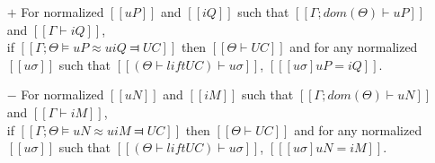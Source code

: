 \begin{lemma} \label{lemma:unification-soundness}
    \hfill
    \begin{itemize}
        \item [$+$] For normalized $[[uP]]$ and $[[iQ]]$ such that 
        $[[Γ ; dom(Θ) ⊢ uP]]$ and $[[Γ ⊢ iQ]]$,\\ 
        if $[[Γ ; Θ ⊨ uP ≈u iQ ⫤ UC]]$ then 
        $[[Θ ⊢ UC]]$ and for any normalized $[[uσ]]$ such that $[[(Θ  ⊢  lift UC) ⊢ uσ]]$,
        $[[ [uσ]uP = iQ ]]$.

        \item [$-$] For normalized $[[uN]]$ and $[[iM]]$ such that
        $[[Γ ; dom(Θ) ⊢ uN]]$ and $[[Γ ⊢ iM]]$,\\
        if $[[Γ ; Θ ⊨ uN ≈u iM ⫤ UC]]$ then 
        $[[Θ ⊢ UC]]$ and for any normalized $[[uσ]]$ such that $[[(Θ  ⊢  lift UC) ⊢ uσ]]$,
        $[[ [uσ]uN = iM ]]$.
    \end{itemize}
\end{lemma}
